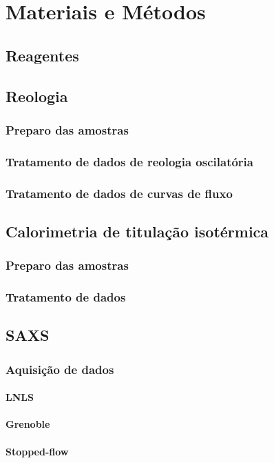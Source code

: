 \part{Materiais e Métodos}
	\chapter{Reagentes}
	\chapter{Reologia}
		\section{Preparo das amostras}
		\section{Tratamento de dados de reologia oscilatória}
		\section{Tratamento de dados de curvas de fluxo}
	\chapter{Calorimetria de titulação isotérmica}
		\section{Preparo das amostras}
		\section{Tratamento de dados}
	\chapter{SAXS}
		\section{Aquisição de dados}
			\subsection{LNLS}
			\subsection{Grenoble}
			\subsection{Stopped-flow}
